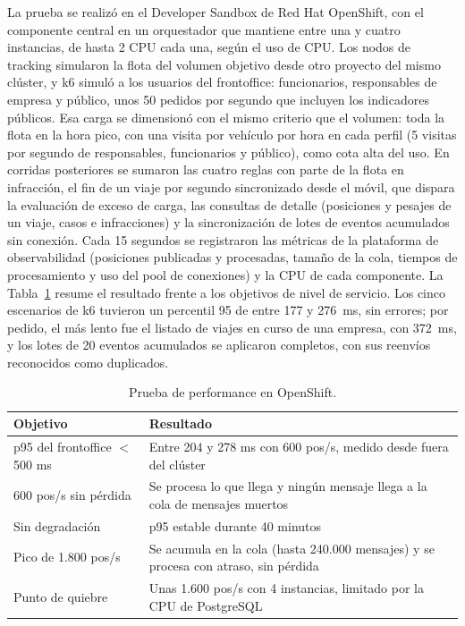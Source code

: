 La prueba se realizó en el Developer Sandbox de Red Hat OpenShift, con el componente central en un orquestador que mantiene entre una y cuatro instancias, de hasta 2 CPU cada una, según el uso de CPU. Los nodos de tracking simularon la flota del volumen objetivo desde otro proyecto del mismo clúster, y k6 \cite{k6} simuló a los usuarios del frontoffice: funcionarios, responsables de empresa y público, unos 50 pedidos por segundo que incluyen los indicadores públicos. Esa carga se dimensionó con el mismo criterio que el volumen: toda la flota en la hora pico, con una visita por vehículo por hora en cada perfil (5 visitas por segundo de responsables, funcionarios y público), como cota alta del uso. En corridas posteriores se sumaron las cuatro reglas con parte de la flota en infracción, el fin de un viaje por segundo sincronizado desde el móvil, que dispara la evaluación de exceso de carga, las consultas de detalle (posiciones y pesajes de un viaje, casos e infracciones) y la sincronización de lotes de eventos acumulados sin conexión. Cada 15 segundos se registraron las métricas de la plataforma de observabilidad (posiciones publicadas y procesadas, tamaño de la cola, tiempos de procesamiento y uso del pool de conexiones) y la CPU de cada componente. La Tabla~\ref{tab:prueba-performance} resume el resultado frente a los objetivos de nivel de servicio. Los cinco escenarios de k6 tuvieron un percentil 95 de entre 177 y 276~ms, sin errores; por pedido, el más lento fue el listado de viajes en curso de una empresa, con 372~ms, y los lotes de 20 eventos acumulados se aplicaron completos, con sus reenvíos reconocidos como duplicados.

\begin{table}
\caption{Prueba de performance en OpenShift.}\label{tab:prueba-performance}
\centering
\begin{tabular}{|p{}|p{}|}
\hline
Objetivo & Resultado \\
\hline
p95 del frontoffice $<$ 500 ms & Entre 204 y 278 ms con 600 pos/s, medido desde fuera del clúster \\
\hline
600 pos/s sin pérdida & Se procesa lo que llega y ningún mensaje llega a la cola de mensajes muertos \\
\hline
Sin degradación & p95 estable durante 40 minutos \\
\hline
Pico de 1.800 pos/s & Se acumula en la cola (hasta 240.000 mensajes) y se procesa con atraso, sin pérdida \\
\hline
Punto de quiebre & Unas 1.600 pos/s con 4 instancias, limitado por la CPU de PostgreSQL \\
\hline
\end{tabular}
\end{table}


